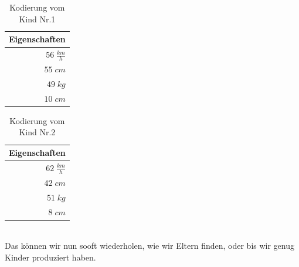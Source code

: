             \begin{multicols}{2}
                \begin{table}[H]
                    \begin{center}
                    \begin{tabular}{ |r| } 
                        \hline
                        \hfill Eigenschaften  \\ \hline
                        \cellcolor{blue!25}   $ 56\; \frac{km}{h}$ \\ \hline
                        \cellcolor{yellow!25} $ 55\; cm          $ \\ \hline
                        \cellcolor{yellow!25} $ 49\; kg          $ \\ \hline
                        \cellcolor{blue!25}   $ 10\; cm          $ \\ \hline
                    \end{tabular}
                    \end{center}
                    \caption{Kodierung vom Kind Nr.1 \label{fig:child-1}}
                \end{table}


                \begin{table}[H]
                    \begin{center}
                    \begin{tabular}{ |r| } 
                        \hline
                        \hfill Eigenschaften  \\ \hline
                        \cellcolor{yellow!25} $ 62\; \frac{km}{h}$ \\ \hline
                        \cellcolor{blue!25}   $ 42\; cm          $ \\ \hline
                        \cellcolor{blue!25}   $ 51\; kg          $ \\ \hline
                        \cellcolor{yellow!25} $  8\; cm          $ \\ \hline
                    \end{tabular}
                    \end{center}
                    \caption{Kodierung vom Kind Nr.2 \label{fig:child-2}}
                \end{table}
            \end{multicols}
            \hfill \\[4mm]
            \noindent
            Das können wir nun sooft wiederholen, wie wir Eltern finden, oder bis wir genug Kinder produziert haben.


